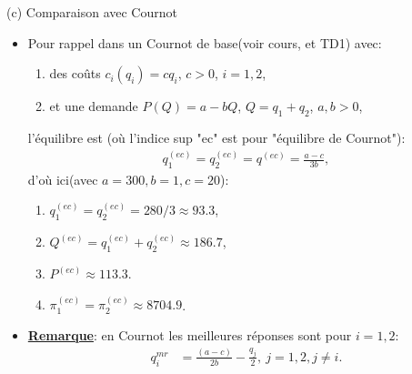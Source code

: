 \begin{frame}[allowframebreaks]{(c) Comparaison avec Cournot}
\begin{itemize} 
\item Pour rappel dans un Cournot de base(voir cours, et TD1) avec:
\begin{enumerate}[-]
\item des coûts $c_i(q_i) = cq_i$, $c>0$, $i=1, 2$,
\item et une demande $P(Q) = a - bQ$, $Q=q_1+q_2$, $a, b > 0$,
\end{enumerate}
l'équilibre est (où l'indice sup "ec" est pour "équilibre de Cournot"):
\begin{align*}
    q_1^{(ec)} = q_2^{(ec)} = q^{(ec)} = \frac{a-c}{3b},
\end{align*}
d'où ici(avec $a=300, b=1, c=20$): 
\begin{enumerate}[-]
\item $q_1^{(ec)}=q_2^{(ec)}=280/3 \approx 93.3$, 
\item $Q^{(ec)} = q_1^{(ec)}+q_2^{(ec)} \approx 186.7$,
\item $P^{(ec)} \approx 113.3$.
\item $\pi^{(ec)}_1 = \pi^{(ec)}_2 \approx 8704.9$.
\end{enumerate}

\item \textbf{\underline{Remarque}}: en Cournot les meilleures réponses sont pour $i=1, 2$:
\begin{align*}
    q_i^{mr}&=\frac{(a-c)}{2b} - \frac{q_j}{2}, \ j=1, 2, j\neq i.
\end{align*} 
\end{itemize}
\end{frame}


